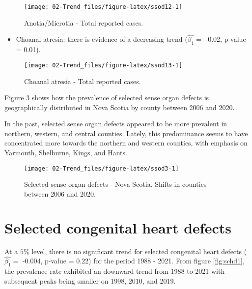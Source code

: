 \documentclass[
]{krantz}
\providecommand{\tightlist}{%
  \setlength{\itemsep}{0pt}\setlength{\parskip}{0pt}}
\begin{document}
\begin{figure}[h]

{\centering \texttt{[image: 02-Trend\_files/figure-latex/ssod12-1]} 

}

\caption{Anotia/Microtia - Total reported cases.}\label{fig:ssod12}
\end{figure}

\begin{itemize}
\tightlist
\item
  Choanal atresia: there is evidence of a decreasing trend (\(\hat{\beta_{1}} =\) -0.02, p-value = 0.01).
\end{itemize}

\begin{figure}[h]

{\centering \texttt{[image: 02-Trend\_files/figure-latex/ssod13-1]} 

}

\caption{Choanal atresia - Total reported cases.}\label{fig:ssod13}
\end{figure}

Figure \ref{fig:ssod3} shows how the prevalence of selected sense organ defects is geographically distributed in Nova Scotia by county between 2006 and 2020.

In the past, selected sense organ defects appeared to be more prevalent in northern, western, and central counties. Lately, this predominance seems to have concentrated more towards the northern and western counties, with emphasis on Yarmouth, Shelburne, Kings, and Hants.

\begin{figure}[h]

{\centering \texttt{[image: 02-Trend\_files/figure-latex/ssod3-1]} 

}

\caption{Selected sense organ defects - Nova Scotia. Shifts in counties between 2006 and 2020.}\label{fig:ssod3}
\end{figure}

\clearpage

\hypertarget{section35}{%
\section{Selected congenital heart defects}\label{section35}}

At a \(5\%\) level, there is no significant trend for selected congenital heart defects (\(\hat{\beta_{1}} =\) -0.004, p-value = 0.22) for the period 1988 - 2021. From figure \ref{fig:schd1}, the prevalence rate exhibited an downward trend from 1988 to 2021 with subsequent peaks being smaller on 1998, 2010, and 2019.
\end{document}
